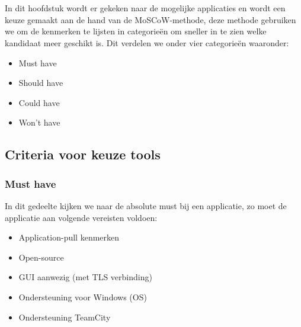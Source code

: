 
\chapter{}
\label{ch:methodologie}


In dit hoofdstuk wordt er gekeken naar de mogelijke applicaties en wordt een keuze gemaakt aan de hand van de MoSCoW-methode, deze methode gebruiken we om de kenmerken te lijsten in categorieën om sneller in te zien welke kandidaat meer geschikt is. Dit verdelen we onder vier categorieën waaronder:
\begin{itemize}
    \item Must have
    \item Should have
    \item Could have
    \item Won't have
\end{itemize}

\section{Criteria voor keuze tools}
\subsection{Must have}

In dit gedeelte kijken we naar de absolute must bij een applicatie, zo moet de applicatie aan volgende vereisten voldoen:

\begin{itemize}
    \item Application-pull kenmerken
    \item Open-source
    \item GUI aanwezig (met TLS verbinding)
    \item Ondersteuning voor Windows (OS)
    \item Ondersteuning TeamCity
\end{itemize}

